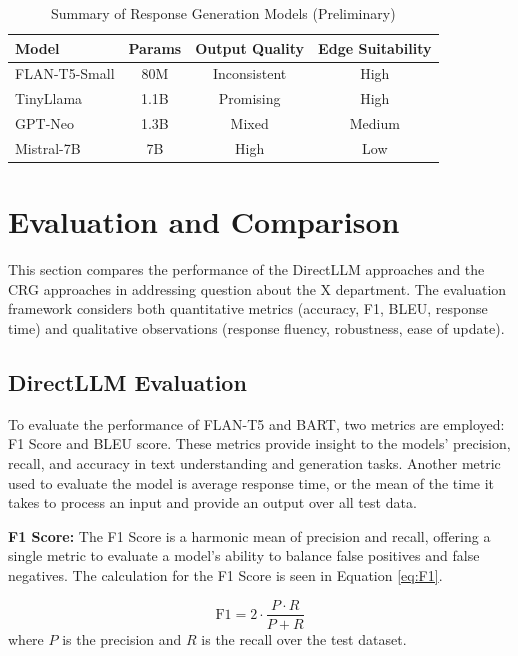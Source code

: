 \documentclass[conference]{IEEEtran}
\begin{document}
\begin{table}[h]
    \centering
    \caption{Summary of Response Generation Models (Preliminary)}
    \begin{tabular}{l|c|c|c}
    \hline
    \textbf{Model} & \textbf{Params} & \textbf{Output Quality} & \textbf{Edge Suitability} \\
    \hline
    FLAN-T5-Small & 80M & Inconsistent & High  \\
    TinyLlama & 1.1B & Promising & High  \\
    GPT-Neo & 1.3B & Mixed & Medium  \\
    Mistral-7B & 7B & High & Low  \\
    \hline
    \end{tabular}
    \label{tab:generation_models}
\end{table}

\section{Evaluation and Comparison} \label{sec:evaluation}
This section compares the performance of the DirectLLM approaches and the CRG approaches in addressing question about the X department.
The evaluation framework considers both quantitative metrics (accuracy, F1, BLEU, response time) and qualitative observations (response fluency, robustness, ease of update).
\subsection{DirectLLM Evaluation}
To evaluate the performance of FLAN-T5 and BART, two metrics are employed: F1 Score and BLEU score. 
These metrics provide insight to the models' precision, recall, and accuracy in text understanding and generation tasks.
Another metric used to evaluate the model is average response time, or the mean of the time it takes to process an input and provide an output over all test data.

\noindent
\textbf{F1 Score:}
The F1 Score is a harmonic mean of precision and recall, offering a single metric to evaluate a model's ability to balance false positives and false negatives.
The calculation for the F1 Score is seen in Equation \ref{eq:F1}.

\begin{equation} \label{eq:F1}
    \text{F1} = 2 \cdot \frac{P \cdot R}{P + R}
\end{equation}
where $P$ is the precision and $R$ is the recall over the test dataset. 
\end{document}
